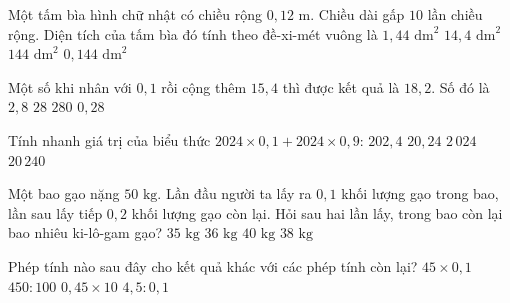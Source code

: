 \begin{ex} %
Một tấm bìa hình chữ nhật có chiều rộng $0{,}12\text{ m}$. Chiều dài gấp $10$ lần chiều rộng. Diện tích của tấm bìa đó tính theo đề-xi-mét vuông là
\choice
{$1{,}44\text{ dm}^2$}
{\True $14{,}4\text{ dm}^2$}
{$144\text{ dm}^2$}
{$0{,}144\text{ dm}^2$}
\end{ex}

\begin{ex} %
Một số khi nhân với $0{,}1$ rồi cộng thêm $15{,}4$ thì được kết quả là $18{,}2$. Số đó là
\choice
{$2{,}8$}
{\True $28$}
{$280$}
{$0{,}28$}
\end{ex}

\begin{ex} %
Tính nhanh giá trị của biểu thức $2024 \times 0{,}1 + 2024 \times 0{,}9$:
\choice
{$202{,}4$}
{$20{,}24$}
{\True $2\,024$}
{$20\,240$}
\end{ex}

\begin{ex} %
Một bao gạo nặng $50\text{ kg}$. Lần đầu người ta lấy ra $0{,}1$ khối lượng gạo trong bao, lần sau lấy tiếp $0{,}2$ khối lượng gạo còn lại. Hỏi sau hai lần lấy, trong bao còn lại bao nhiêu ki-lô-gam gạo?
\choice
{$35\text{ kg}$}
{\True $36\text{ kg}$}
{$40\text{ kg}$}
{$38\text{ kg}$}
\end{ex}

\begin{ex} %
Phép tính nào sau đây cho kết quả khác với các phép tính còn lại?
\choice
{$45 \times 0{,}1$}
{$450 : 100$}
{$0{,}45 \times 10$}
{\True $4{,}5 : 0{,}1$}
\end{ex}


